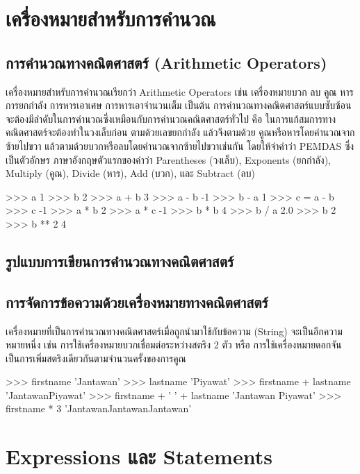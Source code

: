 \section{เครื่องหมายสำหรับการคำนวณ}
\subsection{การคำนวณทางคณิตศาสตร์ (Arithmetic Operators)}

เครื่องหมายสำหรับการคำนวณเรียกว่า  Arithmetic Operators เช่น เครื่องหมายบวก ลบ คูณ หาร การยกกำลัง การหารเอาเศษ การหารเอาจำนวนเต็ม เป็นต้น การคำนวณทางคณิตศาสตร์แบบซับซ้อนจะต้องมีลำดับในการคำนวณซึ่งเหมือนกับการคำนวณคณิตศาสตร์ทั่วไป คือ ในการแก้สมการทางคณิตศาสตร์จะต้องทำในวงเล็บก่อน ตามด้วยเลขยกกำลัง แล้วจึงตามด้วย คูณหรือหารโดยคำนวณจากซ้ายไปขวา แล้วตามด้วยบวกหรือลบโดยคำนวณจากซ้ายไปขวาเช่นกัน โดยให้จำคำว่า PEMDAS ซึ่งเป็นตัวอักษร ภาษาอังกฤษตัวแรกของคำว่า Parentheses (วงเล็บ), Exponents (ยกกำลัง), Multiply (คูณ), Divide (หาร), Add (บวก), และ Subtract (ลบ) 

\begin{pycode}
>>> a
1
>>> b
2
>>> a + b
3
>>> a - b
-1
>>> b - a
1
>>> c = a - b
>>> c
-1
>>> a * b
2
>>> a * c
-1
>>> b * b
4
>>> b / a
2.0
>>> b
2
>>> b ** 2
4
\end{pycode}


\subsection{รูปแบบการเขียนการคำนวณทางคณิตศาสตร์}

\subsection{การจัดการข้อความด้วยเครื่องหมายทางคณิตศาสตร์}

เครื่องหมายที่เป็นการคำนวณทางคณิตศาสตร์เมื่อถูกนำมาใช้กับข้อความ (String) จะเป็นอีกความหมายหนึ่ง เช่น การใช้เครื่องหมายบวกเชื่อมต่อระหว่างสตริง 2 ตัว หรือ การใช้เครื่องหมายดอกจันเป็นการเพิ่มสตริงเดียวกันตามจำนวนครั้งของการคูณ

\begin{pycode}
>>> firstname
'Jantawan'
>>> lastname
'Piyawat'
>>> firstname + lastname
'JantawanPiyawat'
>>> firstname + '  ' + lastname
'Jantawan Piyawat'
>>> firstname * 3
'JantawanJantawanJantawan'
\end{pycode}


\section{Expressions และ Statements}

